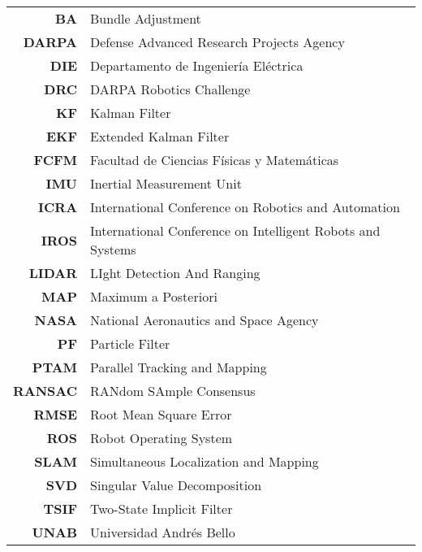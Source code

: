\begin{acronyms}
	\renewcommand\arraystretch{1.5}
	\begin{center}
		\begin{tabular}{r p{12cm}}
			\textbf{BA} 					& Bundle Adjustment
			\\
			\textbf{DARPA} 					& Defense Advanced Research Projects Agency
			\\
			\textbf{DIE} 					& Departamento de Ingeniería Eléctrica
			\\
			\textbf{DRC} 					& DARPA Robotics Challenge
			\\
			\textbf{KF} 					& Kalman Filter
			\\
			\textbf{EKF} 					& Extended Kalman Filter
			\\
			\textbf{FCFM} 					& Facultad de Ciencias Físicas y Matemáticas
			\\
			\textbf{IMU} 					& Inertial Measurement Unit
			\\
			\textbf{ICRA} 					& International Conference on Robotics and Automation
			\\ 
			\textbf{IROS} 					& International Conference on Intelligent Robots and Systems
			\\ 
			\textbf{LIDAR} 					& LIght Detection And Ranging
			\\
			\textbf{MAP} 					& Maximum a Posteriori
			\\ 
			\textbf{NASA} 					& National Aeronautics and Space Agency
			\\ 
			\textbf{PF} 					& Particle Filter
			\\
			\textbf{PTAM} 					& Parallel Tracking and Mapping
			\\
			\textbf{RANSAC} 				& RANdom SAmple Consensus
			\\
			\textbf{RMSE} 					& Root Mean Square Error
			\\ 
			\textbf{ROS} 					& Robot Operating System
			\\ 
			\textbf{SLAM} 					& Simultaneous Localization and Mapping
			\\
			\textbf{SVD} 					& Singular Value Decomposition
			\\
			\textbf{TSIF} 					& Two-State Implicit Filter
			\\
			\textbf{UNAB} 					& Universidad Andrés Bello
			\\ 
		\end{tabular} 
	\end{center}
	
\end{acronyms}
